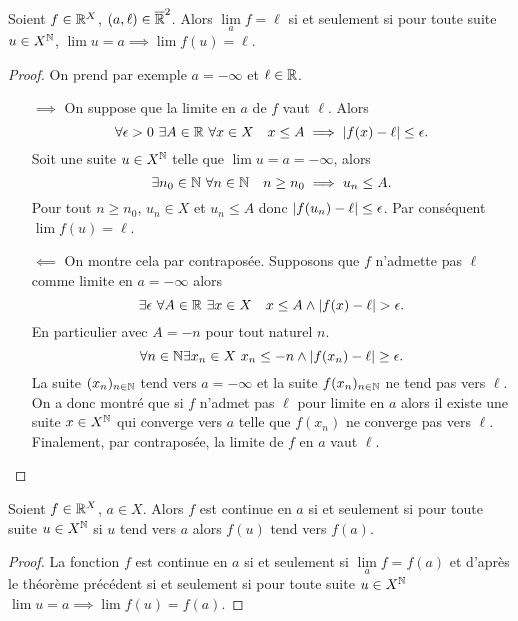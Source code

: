 \begin{theo}
  Soient $f \in \mathbb{R}^X$, $(a,\ell) \in \overline{\mathbb{R}}^2$. Alors $\lim\limits_{a} f=\ell$ si et seulement si pour toute suite $u \in X^{\mathbb{N}}$, $\lim u =a \implies \lim f(u)=\ell$.
\end{theo}
\begin{proof}
  On prend par exemple $a=-\infty$ et $\ell \in \mathbb{R}$.
  \begin{itemize}
  \item[$\implies$] On suppose que la limite en $a$ de $f$ vaut $\ell$. Alors
    \begin{equation}
      \forall \epsilon > 0 \ \exists A \in \mathbb{R} \ \forall x \in X \quad x \leq A \implies \left\lvert f(x)-\ell\right\rvert \leq \epsilon.
    \end{equation}
    Soit une suite $u \in X^{\mathbb{N}}$ telle que $\lim u = a =-\infty$, alors
    \begin{equation}
      \exists n_0 \in \mathbb{N} \ \forall n \in \mathbb{N} \quad n \geq n_0 \implies u_n \leq A.
    \end{equation}
    Pour tout $n \geq n_0$, $u_n \in X$ et $u_n \leq A$ donc $\left\lvert f(u_n) -\ell\right\rvert \leq \epsilon$. Par conséquent $\lim f(u)=\ell$.
  \item[$\impliedby$] On montre cela par contraposée. Supposons que $f$ n'admette pas $\ell$ comme limite en $a=-\infty$ alors
    \begin{equation}
      \exists \epsilon \ \forall A \in \R \ \exists x \in X \quad x \leq A \wedge \abs{f(x)-\ell} > \epsilon.
    \end{equation}
    En particulier avec $A=-n$ pour tout naturel $n$.
    \begin{equation}
      \forall n \in \mathbb{N} \exists x_n \in X \ x_n \leq -n \wedge \left\lvert f(x_n)-\ell\right\rvert \geq \epsilon.
    \end{equation}
    La suite $(x_n)_{n \in \mathbb{N}}$ tend vers $a=-\infty$ et la suite $f(x_n)_{n \in \mathbb{N}}$ ne tend pas vers $\ell$. On a donc montré que si $f$ n'admet pas $\ell$ pour limite en $a$ alors il existe une suite $x \in X^{\mathbb{N}}$ qui converge vers $a$ telle que $f(x_n)$ ne converge pas vers $\ell$. Finalement, par contraposée, la limite de $f$ en $a$ vaut $\ell$.
  \end{itemize}
\end{proof}
\begin{theo}
  Soient $f \in \mathbb{R}^X$, $a \in X$. Alors $f$ est continue en $a$ si et seulement si pour toute suite $u \in X^{\mathbb{N}}$ si $u$ tend vers $a$ alors $f(u)$ tend vers $f(a)$.
\end{theo}
\begin{proof}
  La fonction $f$ est continue en $a$ si et seulement si $\lim\limits_{a}f = f(a)$ et d'après le théorème précédent si et seulement si pour toute suite $u \in X^{\mathbb{N}}$ $\lim u =a \implies \lim f(u)=f(a)$.
\end{proof}

